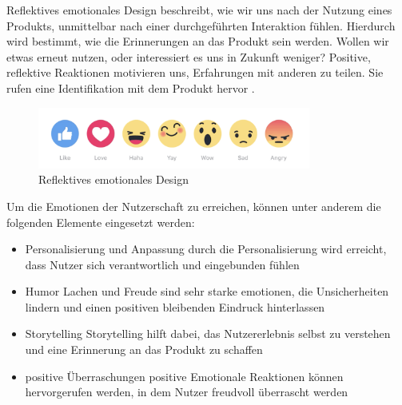\documentclass[./dokumentation.tex]{subfiles}
\begin{document}
Reflektives emotionales Design beschreibt, wie wir uns nach der Nutzung eines Produkts, unmittelbar nach einer durchgeführten Interaktion fühlen. Hierdurch wird bestimmt, wie die Erinnerungen an das Produkt sein werden. Wollen wir etwas erneut nutzen, oder interessiert es uns in Zukunft weniger? Positive, reflektive Reaktionen motivieren uns, Erfahrungen mit anderen zu teilen. Sie rufen eine Identifikation mit dem Produkt hervor \cite{medium_muz}.\\

\begin{figure}
    \centering
    \includegraphics[width=0.8\textwidth]{bilder/refl-design.png}
    \caption{Reflektives emotionales Design \cite{medium_muz}}
    \label{fig3:refl}
\end{figure}\pagebreak

Um die Emotionen der Nutzerschaft zu erreichen, können unter anderem die folgenden Elemente eingesetzt werden: 
\begin{itemize}
    \item Personalisierung und Anpassung
    \subitem{} durch die Personalisierung wird erreicht, dass Nutzer sich verantwortlich und eingebunden fühlen
    \item Humor
    \subitem{} Lachen und Freude sind sehr starke emotionen, die Unsicherheiten lindern und einen positiven bleibenden Eindruck hinterlassen
    \item Storytelling
    \subitem{} Storytelling hilft dabei, das Nutzererlebnis selbst zu verstehen und eine Erinnerung an das Produkt zu schaffen
    \item positive Überraschungen
    \subitem{} positive Emotionale Reaktionen können hervorgerufen werden, in dem Nutzer freudvoll überrascht werden
\end{itemize}

\end{document}
